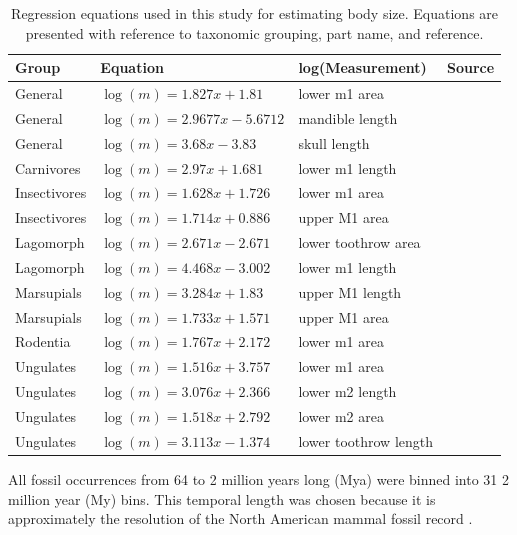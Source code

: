\documentclass[12pt,letterpaper]{article}
\begin{document}
\begin{table}[ht]
  \centering
  \caption{Regression equations used in this study for estimating body size. Equations are presented with reference to taxonomic grouping, part name, and reference.}
  \begin{tabular}{l | l | l | l}
    \hline
    Group & Equation & log(Measurement) & Source \\
    \hline
    General & \(\log(m) = 1.827x + 1.81\) & lower m1 area &  \cite{Legendre1986} \\
    General & \(\log(m) = 2.9677x - 5.6712\) & mandible length & \cite{Foster2009a} \\
    General & \(\log(m) = 3.68x - 3.83\) & skull length & \cite{Luo2001} \\
    Carnivores & \(\log(m) = 2.97x + 1.681\) & lower m1 length & \cite{VanValkenburgh1990} \\
    Insectivores & \(\log(m) = 1.628x + 1.726\) & lower m1 area & \cite{Bloch1998} \\
    Insectivores & \(\log(m) = 1.714x + 0.886\) & upper M1 area & \cite{Bloch1998} \\
    Lagomorph & \(\log(m) = 2.671x - 2.671\) & lower toothrow area & \cite{Tomiya2013} \\
    Lagomorph & \(\log(m) = 4.468x - 3.002\) & lower m1 length & \cite{Tomiya2013} \\
    Marsupials & \(\log(m) = 3.284x + 1.83\) & upper M1 length & \cite{Gordon2003} \\
    Marsupials & \(\log(m) = 1.733x + 1.571\) & upper M1 area & \cite{Gordon2003} \\
    Rodentia & \(\log(m) = 1.767x + 2.172\) & lower m1 area & \cite{Legendre1986} \\
    Ungulates & \(\log(m) = 1.516x + 3.757\) & lower m1 area & \cite{Mendoza2006} \\
    Ungulates & \(\log(m) = 3.076x + 2.366\) & lower m2 length & \cite{Mendoza2006} \\
    Ungulates & \(\log(m) = 1.518x + 2.792\) & lower m2 area & \cite{Mendoza2006} \\
    Ungulates & \(\log(m) = 3.113x - 1.374\) & lower toothrow length & \cite{Mendoza2006} \\
    \hline
  \end{tabular}
  \label{tab:mass_est}
\end{table}


All fossil occurrences from 64 to 2 million years long (Mya) were binned into 31 2 million year (My) bins. This temporal length was chosen because it is approximately the resolution of the North American mammal fossil record \citep{Alroy1996a,Alroy2000g,Marcot2014,Alroy2009}.
\end{document}
